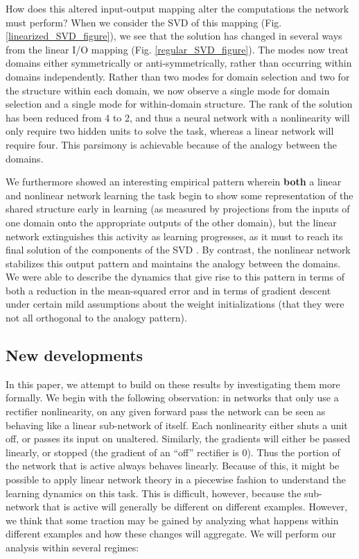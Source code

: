 \documentclass[11pt]{article}
\begin{document}
How does this altered input-output mapping alter the computations the network must perform? When we consider the SVD of this mapping (Fig. \ref{linearized_SVD_figure}), we see that the solution has changed in several ways from the linear I/O mapping (Fig. \ref{regular_SVD_figure}). The modes now treat domains either symmetrically or anti-symmetrically, rather than occurring within domains independently. Rather than two modes for domain selection and two for the structure within each domain, we now observe a single mode for domain selection and a single mode for within-domain structure. The rank of the solution has been reduced from 4 to 2, and thus a neural network with a nonlinearity will only require two hidden units to solve the task, whereas a linear network will require four. This parsimony is achievable because of the analogy between the domains. \par 
We furthermore showed an interesting empirical pattern wherein \textbf{both} a linear and nonlinear network learning the task begin to show some representation of the shared structure early in learning (as measured by projections from the inputs of one domain onto the appropriate outputs of the other domain), but the linear network extinguishes this activity as learning progresses, as it must to reach its final solution of the components of the SVD \citep{Baldi1989,Saxe2013}. By contrast, the nonlinear network stabilizes this output pattern and maintains the analogy between the domains. We were able to describe the dynamics that give rise to this pattern in terms of both a reduction in the mean-squared error and in terms of gradient descent under certain mild assumptions about the weight initializations (that they were not all orthogonal to the analogy pattern). \par
\subsection{New developments}
In this paper, we attempt to build on these results by investigating them more formally. We begin with the following observation: in networks that only use a rectifier nonlinearity, on any given forward pass the network can be seen as behaving like a linear sub-network of itself. Each nonlinearity either shuts a unit off, or passes its input on unaltered. Similarly, the gradients will either be passed linearly, or stopped (the gradient of an ``off'' rectifier is 0). Thus the portion of the network that is active always behaves linearly. Because of this, it might be possible to apply linear network theory in a piecewise fashion to understand the learning dynamics on this task. This is difficult, however, because the sub-network that is active will generally be different on different examples. However, we think that some traction may be gained by analyzing what happens within different examples and how these changes will aggregate. We will perform our analysis within several regimes: \par 
\end{document}
